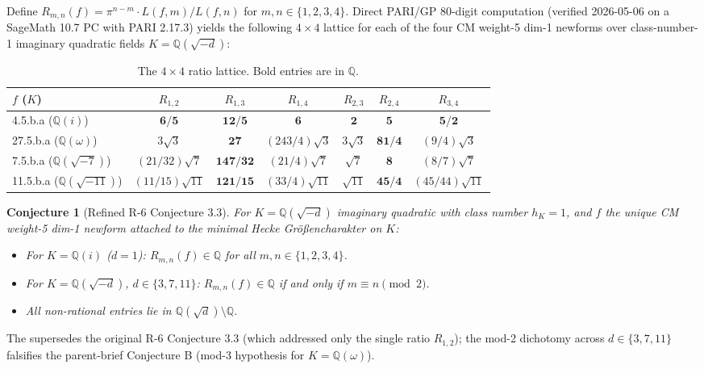 \documentclass[10pt]{article}
\newtheorem{conjecture}[theorem]{Conjecture}
\theoremstyle{definition}
\begin{document}
Define $R_{m,n}(f) = \pi^{n-m} \cdot L(f,m) / L(f,n)$ for $m, n \in \{1,2,3,4\}$. Direct PARI/GP 80-digit computation (verified 2026-05-06 on a SageMath 10.7 PC with PARI 2.17.3) yields the following $4\times 4$ lattice for each of the four CM weight-5 dim-1 newforms over class-number-1 imaginary quadratic fields $K = \mathbb{Q}(\sqrt{-d})$:

\begin{table}[h]
\centering
\begin{tabular}{l|cccccc}
$f$ ($K$) & $R_{1,2}$ & $R_{1,3}$ & $R_{1,4}$ & $R_{2,3}$ & $R_{2,4}$ & $R_{3,4}$ \\
\hline
4.5.b.a ($\mathbb{Q}(i)$) & $\boldsymbol{6/5}$ & $\boldsymbol{12/5}$ & $\boldsymbol{6}$ & $\boldsymbol{2}$ & $\boldsymbol{5}$ & $\boldsymbol{5/2}$ \\
27.5.b.a ($\mathbb{Q}(\omega)$) & $3\sqrt{3}$ & $\boldsymbol{27}$ & $(243/4)\sqrt{3}$ & $3\sqrt{3}$ & $\boldsymbol{81/4}$ & $(9/4)\sqrt{3}$ \\
7.5.b.a ($\mathbb{Q}(\sqrt{-7})$) & $(21/32)\sqrt{7}$ & $\boldsymbol{147/32}$ & $(21/4)\sqrt{7}$ & $\sqrt{7}$ & $\boldsymbol{8}$ & $(8/7)\sqrt{7}$ \\
11.5.b.a ($\mathbb{Q}(\sqrt{-11})$) & $(11/15)\sqrt{11}$ & $\boldsymbol{121/15}$ & $(33/4)\sqrt{11}$ & $\sqrt{11}$ & $\boldsymbol{45/4}$ & $(45/44)\sqrt{11}$ \\
\end{tabular}
\caption{The $4\times 4$ ratio lattice. Bold entries are in $\mathbb{Q}$.}
\label{tab:4x4lattice}
\end{table}

\begin{conjecture}[Refined R-6 Conjecture 3.3]
\label{conj:refined}
For $K = \mathbb{Q}(\sqrt{-d})$ imaginary quadratic with class number $h_K = 1$, and $f$ the unique CM weight-5 dim-1 newform attached to the minimal Hecke Gr\"{o}{\ss}encharakter on $K$:
\begin{itemize}
\item For $K = \mathbb{Q}(i)$ ($d=1$): $R_{m,n}(f) \in \mathbb{Q}$ for all $m, n \in \{1,2,3,4\}$.
\item For $K = \mathbb{Q}(\sqrt{-d})$, $d \in \{3, 7, 11\}$: $R_{m,n}(f) \in \mathbb{Q}$ if and only if $m \equiv n \pmod{2}$.
\item All non-rational entries lie in $\mathbb{Q}(\sqrt{d}) \setminus \mathbb{Q}$.
\end{itemize}
\end{conjecture}

The supersedes the original R-6 Conjecture 3.3 (which addressed only the single ratio $R_{1,2}$); the mod-2 dichotomy across $d \in \{3, 7, 11\}$ falsifies the parent-brief Conjecture B (mod-3 hypothesis for $K=\mathbb{Q}(\omega)$).
\end{document}
